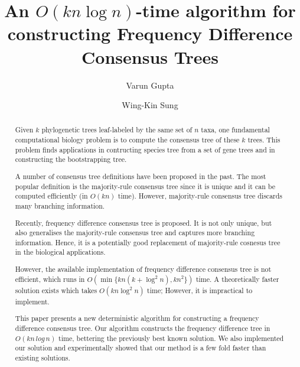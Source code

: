 \documentclass[final,1p,times]{elsarticle}
\begin{document}
\begin{frontmatter}
	\title{An $O(kn \log n)$-time algorithm for constructing Frequency Difference Consensus Trees}
\author[1]{Varun Gupta}
\author[1,2]{Wing-Kin Sung}


\address[1]{School of Computing, National University of Singapore, Singapore}
\address[2]{Genome Institute of Singapore, Singapore}

    \begin{abstract}
	    Given $k$ phylogenetic trees leaf-labeled by the same set of $n$ taxa, one fundamental computational biology problem is to compute the consensus tree of these $k$ trees. This problem finds applications in contructing species tree from a set of gene trees and in constructing the bootstrapping tree.

	    A number of consensus tree definitions have been proposed in the past. The most popular definition is the majority-rule consensus tree since it is unique and it can be computed efficiently (in $O(kn)$ time). However, majority-rule consensus tree discards many branching information.

	    Recently, frequency difference consensus tree is proposed. It is not only unique, but also generalises the majority-rule consensus tree and captures more branching information. Hence, it is a potentially good replacement of majority-rule cosnesus tree in the biological applications.

	    However, the available implementation of frequency difference consensus tree is not efficient, which runs in $O(\min \{ kn(k + \log^2 n), k n^2 \} )$ time. A theoretically faster solution exists which takes $O(k n \log^2 n)$ time; However, it is impractical to implement.

	    This paper presents a new deterministic algorithm for constructing a frequency difference consensus tree. Our algorithm constructs the frequency difference tree in $O(kn\,log\,n)$ time, bettering the previously best known solution. We also implemented our solution and experimentally showed that our method is a few fold faster than existing solutions.
    \end{abstract}

	\begin{keyword}
	\end{keyword}

\end{frontmatter}
\end{document}
